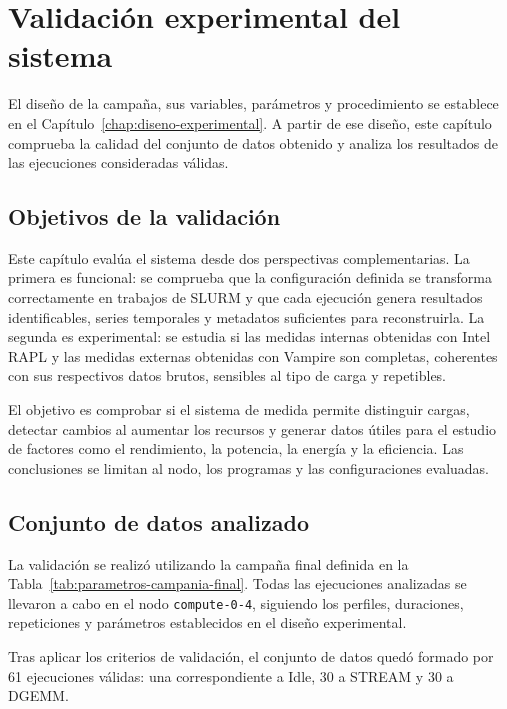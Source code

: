 \chapter{Validación experimental del sistema}
\label{chap:validacion-experimental}

El diseño de la campaña, sus variables, parámetros y procedimiento se establece en el Capítulo~\ref{chap:diseno-experimental}. A partir de ese diseño, este capítulo comprueba la calidad del conjunto de datos obtenido y analiza los resultados de las ejecuciones consideradas válidas.

\section{Objetivos de la validación}
\label{sec:objetivos-validacion}

Este capítulo evalúa el sistema desde dos perspectivas complementarias. La primera es funcional: se comprueba que la configuración definida se transforma correctamente en trabajos de SLURM y que cada ejecución genera resultados identificables, series temporales y metadatos suficientes para reconstruirla. La segunda es experimental: se estudia si las medidas internas obtenidas con Intel RAPL y las medidas externas obtenidas con Vampire son completas, coherentes con sus respectivos datos brutos, sensibles al tipo de carga y repetibles.

El objetivo es comprobar si el sistema de medida permite distinguir cargas, detectar cambios al aumentar los recursos y generar datos útiles para el estudio de factores como el rendimiento, la potencia, la energía y la eficiencia. Las conclusiones se limitan al nodo, los programas y las configuraciones evaluadas.

\section{Conjunto de datos analizado}
\label{sec:configuracion-cap6}

La validación se realizó utilizando la campaña final definida en la Tabla~\ref{tab:parametros-campania-final}. Todas las ejecuciones analizadas se llevaron a cabo en el nodo \texttt{compute-0-4}, siguiendo los perfiles, duraciones, repeticiones y parámetros establecidos en el diseño experimental.

Tras aplicar los criterios de validación, el conjunto de datos quedó formado por 61 ejecuciones válidas: una correspondiente a Idle, 30 a STREAM y 30 a DGEMM.

